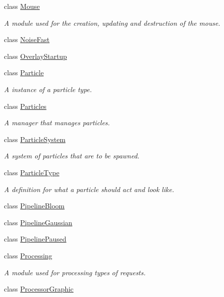 \begin{DoxyCompactItemize}
class \hyperlink{class_flounder_1_1_mouse}{Mouse}
\begin{DoxyCompactList}\small\item\em A module used for the creation, updating and destruction of the mouse. \end{DoxyCompactList}\item 
class \hyperlink{class_flounder_1_1_noise_fast}{Noise\+Fast}
\item 
class \hyperlink{class_flounder_1_1_overlay_startup}{Overlay\+Startup}
\item 
class \hyperlink{class_flounder_1_1_particle}{Particle}
\begin{DoxyCompactList}\small\item\em A instance of a particle type. \end{DoxyCompactList}\item 
class \hyperlink{class_flounder_1_1_particles}{Particles}
\begin{DoxyCompactList}\small\item\em A manager that manages particles. \end{DoxyCompactList}\item 
class \hyperlink{class_flounder_1_1_particle_system}{Particle\+System}
\begin{DoxyCompactList}\small\item\em A system of particles that are to be spawned. \end{DoxyCompactList}\item 
class \hyperlink{class_flounder_1_1_particle_type}{Particle\+Type}
\begin{DoxyCompactList}\small\item\em A definition for what a particle should act and look like. \end{DoxyCompactList}\item 
class \hyperlink{class_flounder_1_1_pipeline_bloom}{Pipeline\+Bloom}
\item 
class \hyperlink{class_flounder_1_1_pipeline_gaussian}{Pipeline\+Gaussian}
\item 
class \hyperlink{class_flounder_1_1_pipeline_paused}{Pipeline\+Paused}
\item 
class \hyperlink{class_flounder_1_1_processing}{Processing}
\begin{DoxyCompactList}\small\item\em A module used for processing types of requests. \end{DoxyCompactList}\item 
class \hyperlink{class_flounder_1_1_processor_graphic}{Processor\+Graphic}

\end{DoxyCompactItemize}
